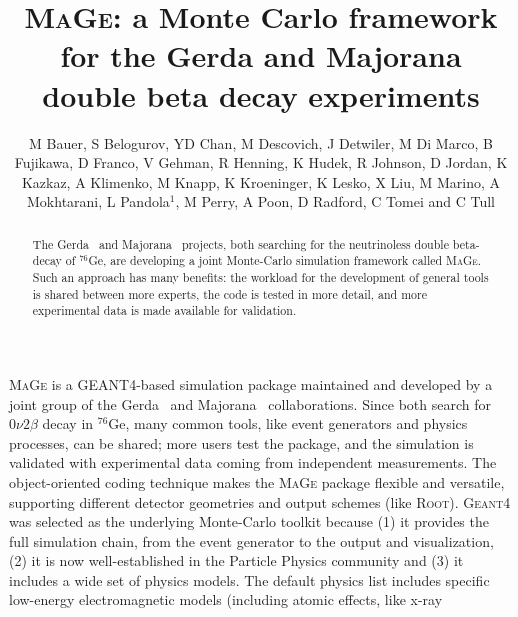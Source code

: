 \documentclass[a4paper]{jpconf}
\begin{document}
\title{\textsc{MaGe}: a Monte Carlo framework for the Gerda and Majorana 
double beta decay experiments}

\author{M Bauer, S Belogurov, YD Chan, M Descovich, J Detwiler, M Di Marco, 
B Fujikawa, D Franco, V Gehman, R Henning, K Hudek, R Johnson, D Jordan, 
K Kazkaz, A Klimenko, M Knapp, K Kroeninger, K Lesko, X Liu, M Marino, 
A Mokhtarani, L Pandola$^1$, M Perry, A Poon, D Radford, C Tomei and C Tull}

%
\begin{abstract}
The Gerda~\cite{gerda} and Majorana~\cite{majo} projects, both searching for 
the neutrinoless double beta-decay of $^{76}$Ge, are developing a joint 
Monte-Carlo simulation framework called \textsc{MaGe}. Such an approach has 
many benefits: the workload for the development of general tools is shared 
between more experts, the code is tested in more detail, and more experimental 
data is made available for validation. 
\end{abstract}
%
\textsc{MaGe} is a \textsc{GEANT4}-based simulation package maintained and 
developed by a joint group of the Gerda~\cite{gerda} and Majorana~\cite{majo} 
collaborations. Since both search for $0\nu 2\beta$ decay in $^{76}$Ge, many 
common tools, like event generators and physics processes, can be shared; more 
users test the package, and the simulation is validated with experimental data 
coming from independent measurements. The object-oriented coding technique 
makes the \textsc{MaGe} package flexible and versatile, supporting different 
detector geometries and output schemes (like \textsc{Root}).  
\textsc{Geant4} was selected as the underlying Monte-Carlo toolkit because 
(1) it provides the full simulation chain, from the event generator to the 
output and visualization, (2) it is now well-established in the Particle 
Physics community and (3) it includes a wide set of physics models. 
The default physics list includes specific low-energy electromagnetic
models (including atomic effects, like x-ray  
\end{document}
